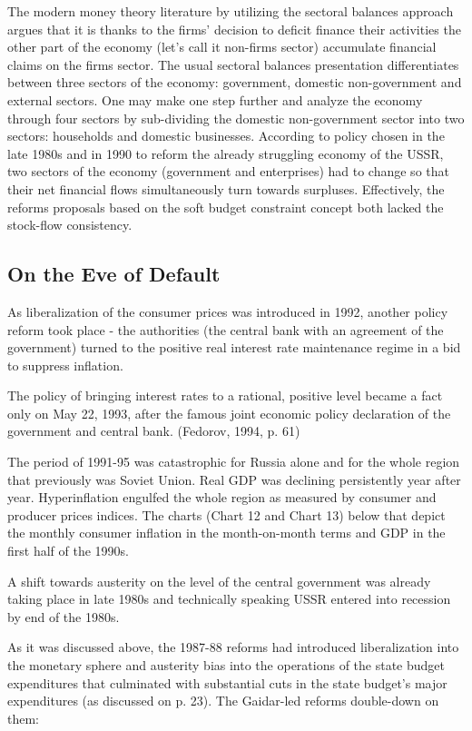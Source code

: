 The modern money theory literature by utilizing the sectoral balances approach argues that it is thanks to the firms' decision to deficit finance their activities the other part of the economy (let's call it non-firms sector) accumulate financial claims on the firms sector. The usual sectoral balances presentation differentiates between three sectors of the economy: government, domestic non-government and external sectors. One may make one step further and analyze the economy through four sectors by sub-dividing the domestic non-government sector into two sectors: households and domestic businesses. According to policy chosen in the late 1980s and in 1990 to reform the already struggling economy of the USSR, two sectors of the economy (government and enterprises) had to change so that their net financial flows simultaneously turn towards surpluses. Effectively, the reforms proposals based on the soft budget constraint concept both lacked the stock-flow consistency.

\subsection{On the Eve of Default}

As liberalization of the consumer prices was introduced in 1992, another policy reform took place - the authorities (the central bank with an agreement of the government) turned to the positive real interest rate maintenance regime in a bid to suppress inflation.

The policy of bringing interest rates to a rational, positive level became a fact only on May 22, 1993, after the famous joint economic policy declaration of the government and central bank. (Fedorov, 1994, p. 61)

The period of 1991-95 was catastrophic for Russia alone and for the whole region that previously was Soviet Union. Real GDP was declining persistently year after year. Hyperinflation engulfed the whole region as measured by consumer and producer prices indices. The charts (Chart 12 and Chart 13) below that depict the monthly consumer inflation in the month-on-month terms and GDP in the first half of the 1990s.

A shift towards austerity on the level of the central government was already taking place in late 1980s and technically speaking USSR entered into recession by end of the 1980s.

As it was discussed above, the 1987-88 reforms had introduced liberalization into the monetary sphere and austerity bias into the operations of the state budget expenditures that culminated with substantial cuts in the state budget's major expenditures (as discussed on p. 23). The Gaidar-led reforms double-down on them:

